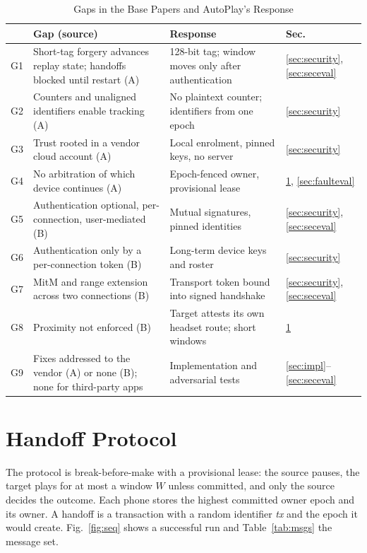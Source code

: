 \documentclass[conference]{IEEEtran}
\begin{document}
\begin{table}[t]
\caption{Gaps in the Base Papers and AutoPlay's Response}
\label{tab:gaps}
\centering
\footnotesize
\begin{tabularx}{\columnwidth}{@{}L{0.45cm}YYL{0.6cm}@{}}
\toprule
 & \textbf{Gap (source)} & \textbf{Response} & \textbf{Sec.} \\
\midrule
G1 & Short-tag forgery advances replay state; handoffs blocked until restart (A) & 128-bit tag; window moves only after authentication & \ref{sec:security}, \ref{sec:seceval} \\
G2 & Counters and unaligned identifiers enable tracking (A) & No plaintext counter; identifiers from one epoch & \ref{sec:security} \\
G3 & Trust rooted in a vendor cloud account (A) & Local enrolment, pinned keys, no server & \ref{sec:security} \\
G4 & No arbitration of which device continues (A) & Epoch-fenced owner, provisional lease & \ref{sec:protocol}, \ref{sec:faulteval} \\
G5 & Authentication optional, per-connection, user-mediated (B) & Mutual signatures, pinned identities & \ref{sec:security}, \ref{sec:seceval} \\
G6 & Authentication only by a per-connection token (B) & Long-term device keys and roster & \ref{sec:security} \\
G7 & MitM and range extension across two connections (B) & Transport token bound into signed handshake & \ref{sec:security}, \ref{sec:seceval} \\
G8 & Proximity not enforced (B) & Target attests its own headset route; short windows & \ref{sec:protocol} \\
G9 & Fixes addressed to the vendor (A) or none (B); none for third-party apps & Implementation and adversarial tests & \ref{sec:impl}--\ref{sec:seceval} \\
\bottomrule
\end{tabularx}
\end{table}

\section{Handoff Protocol}\label{sec:protocol}

The protocol is break-before-make with a provisional lease: the source pauses, the target plays for at most a window $W$ unless committed, and only the source decides the outcome. Each phone stores the highest committed owner epoch and its owner. A handoff is a transaction with a random identifier \textit{tx} and the epoch it would create. Fig.~\ref{fig:seq} shows a successful run and Table~\ref{tab:msgs} the message set.
\end{document}
